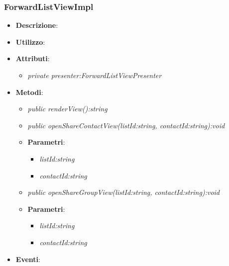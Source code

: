 \subsubsection{ForwardListViewImpl}
\begin{itemize}
\item \textbf{Descrizione}: 
\item \textbf{Utilizzo}:
\item \textbf{Attributi}: 
	\begin{itemize}
	\item \textit{private presenter:ForwardListViewPresenter}\\
	
	\end{itemize}
\item \textbf{Metodi}:
	\begin{itemize}	
	\item \textit{public renderView():string}\\

	\item \textit{public openShareContactView(listId:string, contactId:string):void}\\
	
			\item{\textbf{Parametri}: \begin{itemize}
			\item \textit{listId:string}\\
			
			\item \textit{contactId:string}\\
	
			\end{itemize}}
	\item \textit{public openShareGroupView(listId:string, contactId:string):void}\\

			\item{\textbf{Parametri}: \begin{itemize}
			\item \textit{listId:string}\\
			
			\item \textit{contactId:string}\\

			\end{itemize}}
	\end{itemize}
\item \textbf{Eventi}:
\end{itemize}

